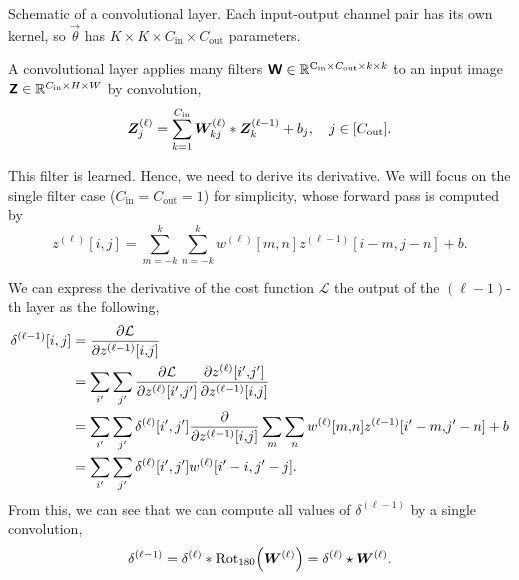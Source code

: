 \begin{marginfigure}
    \centering
    \caption{Schematic of a convolutional layer. Each input-output channel pair has its own kernel,
        so $\vec{\theta}$ has $K\times K \times C_{\mathrm{in}} \times C_{\mathrm{out}}$ parameters.}
    \label{fig:convolutional-layer}
\end{marginfigure}

A convolutional layer applies many filters $\bm{\mathsf{W}} \in \mathbb{R}^{\mathrm{C_{in}} \times
        C_{\mathrm{out}} \times k \times k}$ to an input image $\bm{\mathsf{Z}} \in \mathbb{R}^{C_{\mathrm{in}} \times H
        \times W}$ by convolution, \[
    \bm{Z}^{(\ell)}_j = \sum_{k=1}^{C_{\mathrm{in}}} \bm{W}^{(\ell)}_{kj} * \bm{Z}^{(\ell - 1)}_k + b_j, \quad j \in [C_{\mathrm{out}}].
\]

This filter is learned. Hence, we need to derive its derivative. We will focus on the single filter
case ($C_{\mathrm{in}} = C_{\mathrm{out}} = 1$) for simplicity, whose forward pass is computed by \[
    z^{(\ell)}[i,j] = \sum_{m=-k}^{k} \sum_{n=-k}^{k} w^{(\ell)}[m,n] z^{(\ell-1)}[i-m,j-n] + b.
\]

We can express the derivative of the cost function $\mathcal{L}$ \wrt the output of the
$(\ell-1)$-th layer as the following,
\begin{align*}
    \delta^{(\ell-1)}[i,j] & = \pdv{\mathcal{L}}{z^{(\ell-1)}[i{,}j]}                                                                                                   \\
                           & = \sum_{i'} \sum_{j'} \pdv{\mathcal{L}}{z^{(\ell)}[i'{,}j']} \pdv{z^{(\ell)}[i'{,}j']}{z^{(\ell-1)}[i{,}j]}                                \\
                           & = \sum_{i'} \sum_{j'} \delta^{(\ell)}[i',j'] \pdv*{\sum_{m} \sum_{n} w^{(\ell)}[m{,}n] z^{(\ell-1)}[i'-m{,}j'-n] + b}{z^{(\ell-1)}[i{,}j]} \\
                           & = \sum_{i'} \sum_{j'} \delta^{(\ell)}[i',j'] w^{(\ell)}[i'-i,j'-j].
\end{align*}
From this, we can see that we can compute all values of $\delta^{(\ell-1)}$ by a single convolution, \[
    \delta^{(\ell-1)} = \delta^{(\ell)} * \mathrm{Rot}_{180} \lft( \mat{W}^{(\ell)} \rgt) = \delta^{(\ell)} \star \mat{W}^{(\ell)}.
\]

